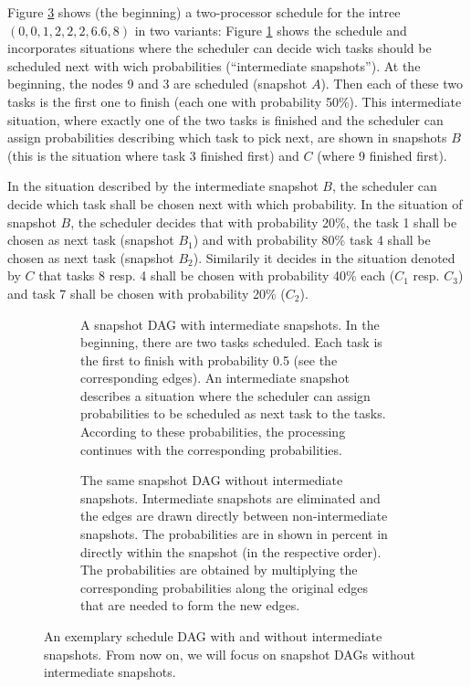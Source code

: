 Figure \ref{fig:schedule-dag-intro} shows (the beginning) a two-processor schedule for the intree $(0,0,1,2,2,2,6.6,8)$ in two variants: Figure \ref{fig:schedule-dag-intro-intermediates} shows the schedule and incorporates situations where the scheduler can decide wich tasks should be scheduled next with wich probabilities (``intermediate snapshots''). At the beginning, the nodes 9 and 3 are scheduled (snapshot $A$). Then each of these two tasks is the first one to finish (each one with probability 50\%). This intermediate situation, where exactly one of the two tasks is finished and the scheduler can assign probabilities describing which task to pick next, are shown in snapshots $B$ (this is the situation where task 3 finished first) and $C$ (where 9 finished first).

In the situation described by the intermediate snapshot $B$, the scheduler can decide which task shall be chosen next with which probability. In the situation of snapshot $B$, the scheduler decides that with probability 20\%, the task 1 shall be chosen as next task (snapshot $B_1$) and with probability 80\% task 4 shall be chosen as next task (snapshot $B_2$). Similarily it decides in the situation denoted by $C$ that tasks 8 resp. 4 shall be chosen with probability 40\% each ($C_1$ resp. $C_3$) and task 7 shall be chosen with probability 20\% ($C_2$).

\begin{figure}[th]
  \centering
  \begin{subfigure}{\textwidth}
    \centering
    
    \caption{A snapshot DAG with intermediate snapshots. In the beginning, there are two tasks scheduled. Each task is the first to finish with probability 0.5 (see the corresponding edges). An intermediate snapshot describes a situation where the scheduler can assign probabilities to be scheduled as next task to the tasks. According to these probabilities, the processing continues with the corresponding probabilities.}
  \label{fig:schedule-dag-intro-intermediates}
  \end{subfigure}
  \begin{subfigure}{\textwidth}
    \centering
    
    \caption{The same snapshot DAG without intermediate snapshots. Intermediate snapshots are eliminated and the edges are drawn directly between non-intermediate snapshots. The probabilities are in shown in percent in directly within the snapshot (in the respective order). The probabilities are obtained by multiplying the corresponding probabilities along the original edges that are needed to form the new edges.}
  \label{fig:schedule-dag-intro-no-intermediates}
  \end{subfigure}
  \caption{An exemplary schedule DAG with and without intermediate snapshots. From now on, we will focus on snapshot DAGs without intermediate snapshots.}
  \label{fig:schedule-dag-intro}
\end{figure}

